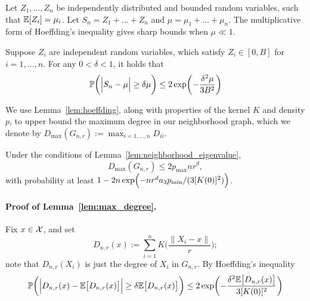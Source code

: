 Let $Z_1,\ldots,Z_n$ be independently distributed and bounded random variables, such that $\mathbb{E}[Z_i] = \mu_i$. Let $S_n = Z_1 + \ldots + Z_n$ and $\mu = \mu_1 + \ldots + \mu_n$. The multiplicative form of Hoeffding's inequality gives sharp bounds when $\mu \ll 1$. 
\begin{lemma}
	\label{lem:hoeffding}
	Suppose $Z_i$ are independent random variables, which satisfy $Z_i \in [0,B]$ for $i = 1,\ldots,n$. For any $0 < \delta < 1$, it holds that
	\begin{equation*}
	\mathbb{P}\biggl(\Bigl|S_n - \mu\Bigr| \geq \delta \mu\biggr) \leq 2\exp\biggl(-\frac{\delta^2\mu}{3B^2}\biggr)
	\end{equation*}
\end{lemma}
We use Lemma~\ref{lem:hoeffding}, along with properties of the kernel $K$ and density $p$, to upper bound the maximum degree in our neighborhood graph, which we denote by $D_{\max}(G_{n,r}) := \max_{i = 1,\ldots,n} D_{ii}$.
\begin{lemma}
	\label{lem:max_degree}
	Under the conditions of Lemma~\ref{lem:neighborhood_eigenvalue},
	\begin{equation*}
	D_{\max}(G_{n,r}) \leq 2p_{\max}nr^d,
	\end{equation*}
	with probability at least $1 - 2n\exp\Bigl(-nr^da_3p_{\min}/(3[K(0)]^2)\Bigr)$. 
\end{lemma}

\paragraph{Proof of Lemma~\ref{lem:max_degree}.}
Fix $x \in \mathcal{X}$, and set
\begin{equation*}
D_{n,r}(x) :=  \sum_{i = 1}^{n} K\biggl(\frac{\|X_i - x\|}{r}\biggr);
\end{equation*}
note that $D_{n,r}(X_i)$ is just the degree of $X_i$ in $G_{n,r}$. By Hoeffding's inequality
\begin{equation}
\label{pf:max_degree_1}
\mathbb{P}\biggl(\Bigl|D_{n,r}(x) - \mathbb{E}\bigl[D_{n,r}(x)\bigr]\Bigr| \geq \delta \mathbb{E}\bigl[D_{n,r}(x)\bigr]\biggr) \leq 2\exp\biggl(-\frac{\delta^2\mathbb{E}\bigl[D_{n,r}(x)\bigr]}{3[K(0)]^2}\biggr)
\end{equation}

